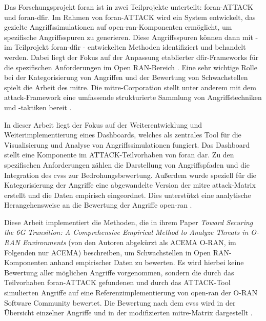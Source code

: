 \par Das Forschungsprojekt \gls{foran} ist in zwei Teilprojekte unterteilt: \gls{foran}-ATTACK und \gls{foran}-\gls{dfir}. Im Rahmen von \gls{foran}-ATTACK wird ein System entwickelt, das gezielte Angriffssimulationen auf \gls{open-ran}-Komponenten ermöglicht, um spezifische Angriffsspuren zu generieren. Diese Angriffsspuren können dann mit - im Teilprojekt \gls{foran}-\gls{dfir} - entwickelten Methoden identifiziert und behandelt werden. Dabei liegt der Fokus auf der Anpassung etablierter \gls{dfir}-Frameworks für die spezifischen Anforderungen im Open RAN-Bereich \autocite{5GFORAN}. Eine sehr wichtige Rolle bei der Kategorisierung von Angriffen und der Bewertung von Schwachstellen spielt die Arbeit des \gls{mitre}. Die \gls{mitre}-Corporation stellt unter anderem mit dem \gls{attack}-Framework eine umfassende strukturierte Sammlung von Angriffstechniken und -taktiken bereit \autocite{SolvingProblemsSafer2024,MITREATTCK}.
\par
In dieser Arbeit liegt der Fokus auf der Weiterentwicklung und Weiterimplementierung eines Dashboards, welches als zentrales Tool für die Visualisierung und Analyse von Angriffssimulationen fungiert. Das Dashboard stellt eine Komponente im ATTACK-Teilvorhaben von \gls{foran} dar. Zu den spezifischen Anforderungen zählen die Darstellung von Angriffspfaden und die Integration des \gls{cvss} zur Bedrohungsbewertung. Außerdem wurde speziell für die Kategorisierung der Angriffe eine abgewandelte Version der \gls{mitre} \gls{attack}-Matrix erstellt und die Daten empirisch eingeordnet. Dies unterstützt eine analytische Herangehensweise an die Bewertung der Angriffe \gls{open-ran} \autocite{dieterichDevelopmentAdversarySimulation2024}.
\par
Diese Arbeit implementiert die Methoden, die \citeauthor{klementSecuring6GTransition2024} in ihrem Paper \textit{Toward Securing the 6G Transition: A Comprehensive Empirical Method to  Analyze Threats in O-RAN Environments} (von den Autoren abgekürzt als ACEMA O-RAN, im Folgenden nur ACEMA) beschreiben, um Schwachstellen in Open RAN-Komponenten anhand empirischer Daten zu bewerten. Es wird hierbei keine Bewertung aller möglichen Angriffe vorgenommen, sondern die durch das Teilvorhaben \gls{foran}-ATTACK gefundenen und durch das ATTACK-Tool simulierten Angriffe auf eine Referenzimplementierung von \gls{open-ran} der O-RAN Software Community bewertet. Die Bewertung nach dem \gls{cvss} wird in der Übersicht einzelner Angriffe und in der modifizierten \gls{mitre}-Matrix dargestellt \autocite{dieterichDevelopmentAdversarySimulation2024,klementSecuring6GTransition2024}.
